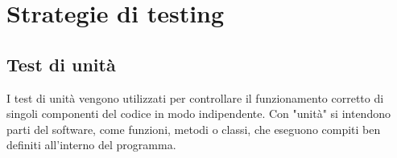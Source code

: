 


\section{Strategie di testing}
\label{sec:strategie di testing}

\subsection{Test di unità}
\label{sec:Test di unità}
I test di unità vengono utilizzati per controllare il funzionamento corretto di singoli componenti del codice in modo indipendente. Con "unità" si intendono parti del software, come funzioni, metodi o classi, che eseguono compiti ben definiti all'interno del programma.
